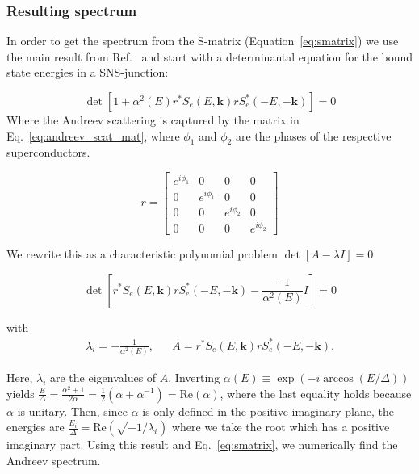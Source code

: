 		\subsubsection{Resulting spectrum}
			In order to get the spectrum from the S-matrix (Equation~\eqref{eq:smatrix}) we use the main result from Ref.~\cite{beenakker_universal_1991} and start with a determinantal equation for the bound state energies in a SNS-junction:

			\begin{equation}
			\det\left[1+\alpha^{2}\left(E\right)r^{*}S_{e}\left(E,\bm{k}\right)rS_{e}^{*}\left(-E,-\bm{k}\right)\right]=0
			\label{eq:bound_state_condition_sjl}
			\end{equation}
			Where the Andreev scattering is captured by the matrix in Eq.~\ref{eq:andreev_scat_mat}, where $\phi_1$ and $\phi_2$ are the phases of the respective superconductors.

			\begin{equation}
				r = \left[\begin{array}{llll}
		    		e^{i \phi_1}&0&0&0\\
		    		0&e^{i \phi_1}&0&0\\
		    		0&0&e^{i \phi_2}&0\\
		    		0&0&0&e^{i \phi_2}
		    		\end{array}\right]
				\label{eq:andreev_scat_mat}
			\end{equation}

			We rewrite this as a characteristic polynomial problem $\det\left[A-\lambda I\right]=0$

			\begin{equation}
			\det\left[r^{*}S_{e}\left(E,\bm{k}\right)rS_{e}^{*}\left(-E,-\bm{k}\right)-\frac{-1}{\alpha^{2}\left(E\right)}I\right]=0
			\end{equation}

			with
			\begin{align}
			\lambda_i=-\frac{1}{\alpha^{2}\left(E\right)},&&A=r^{*}S_{e}\left(E,\bm{k}\right)rS_{e}^{*}\left(-E,-\bm{k}\right).
			\end{align}

			Here, $\lambda_i$ are the eigenvalues of $A$.
			Inverting $\alpha\left(E\right)\equiv\exp\left(-i\arccos\left(E/\Delta\right)\right)$ yields $\frac{E}{\Delta}=\frac{\alpha^{2}+1}{2\alpha}=\frac{1}{2}\left(\alpha+\alpha^{-1}\right)=\textrm{Re}(\alpha)$, where the last equality holds because $\alpha$ is unitary.
			Then, since $\alpha$ is only defined in the positive imaginary plane, the energies are $\frac{E_{i}}{\Delta}=\textrm{Re}\left(\sqrt{-1/\lambda_{i}}\right)$ where we take the root which has a positive imaginary part.
			Using this result and Eq.~\eqref{eq:smatrix}, we numerically find the Andreev spectrum.


